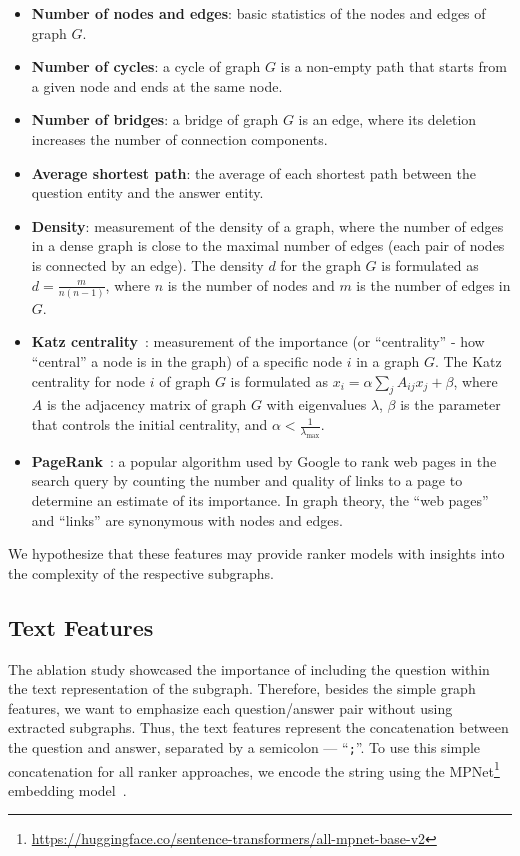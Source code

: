 \begin{itemize}
    \item \textbf{Number of nodes and edges}: basic statistics of the nodes and edges of graph $G$.
    \item \textbf{Number of cycles}: a cycle of graph $G$ is a non-empty path that starts from a given node and ends at the same node. 
    \item \textbf{Number of bridges}: a bridge of graph $G$ is an edge, where its deletion increases the number of connection components. 
    \item \textbf{Average shortest path}: the average of each shortest path between the question entity and the answer entity. 
    \item \textbf{Density}: measurement of the density of a graph, where the number of edges in a dense graph is close to the maximal number of edges (each pair of nodes is connected by an edge). The density $d$ for the graph $G$ is formulated as $d = \frac{m}{n(n-1)}$, where $n$ is the number of nodes and $m$ is the number of edges in $G$.
   \item \textbf{Katz centrality}~\cite{katz1953new}: measurement of the importance (or ``centrality'' - how ``central'' a node is in the graph) of a specific node $i$ in a graph $G$. The Katz centrality for node $i$ of graph $G$ is formulated as $x_i = \alpha \sum_{j} A_{ij} x_j + \beta$, where $A$ is the adjacency matrix of graph $G$ with eigenvalues $\lambda$, $\beta$ is the parameter that controls the initial centrality, and $\alpha < \frac{1}{\lambda_{\max}}$. 
    \item \textbf{PageRank}~\cite{page1999pagerank}: a popular algorithm used by Google to rank web pages in the search query by counting the number and quality of links to a page to determine an estimate of its importance. In graph theory, the ``web pages'' and ``links'' are synonymous with nodes and edges. 
\end{itemize}

\noindent We hypothesize that these features may provide ranker models with insights into the complexity of the respective subgraphs.


\subsection{Text Features}
\label{sec:controllable_fusion:text_features} 
The ablation study showcased the importance of including the question within the text representation of the subgraph. Therefore, besides the simple graph features, we want to emphasize each question/answer pair without using extracted subgraphs. Thus, the text features represent the concatenation between the question and answer, separated by a semicolon --- ``\texttt{;}''. To use this simple concatenation for all ranker approaches, we encode the string using the MPNet\footnote{\url{https://huggingface.co/sentence-transformers/all-mpnet-base-v2}} embedding model~\cite{DBLP:conf/nips/Song0QLL20}.


